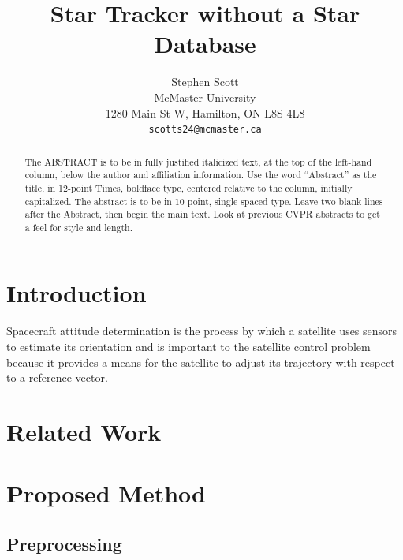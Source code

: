 \documentclass[10pt,twocolumn,letterpaper]{article}
\begin{document}
\title{Star Tracker without a Star Database}

\author{Stephen Scott\\
McMaster University\\
1280 Main St W, Hamilton, ON L8S 4L8\\
{\tt\small scotts24@mcmaster.ca}
}
\maketitle

\begin{abstract}
   The ABSTRACT is to be in fully justified italicized text, at the top of the left-hand column, below the author and affiliation information.
   Use the word ``Abstract'' as the title, in 12-point Times, boldface type, centered relative to the column, initially capitalized.
   The abstract is to be in 10-point, single-spaced type.
   Leave two blank lines after the Abstract, then begin the main text.
   Look at previous CVPR abstracts to get a feel for style and length.
\end{abstract}

\section{Introduction}
\label{sec:intro}

Spacecraft attitude determination is the process by which a satellite uses sensors to estimate its orientation and is important to the satellite control problem because it provides a means for the satellite to adjust its trajectory with respect to a reference vector.

\section{Related Work}
\label{sec:related}

\section{Proposed Method}
\label{sec:method}

\subsection{Preprocessing}
\end{document}
